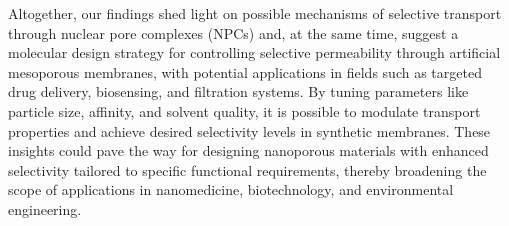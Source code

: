 \documentclass[12pt, a4paper]{article}
\begin{document}



Altogether, our findings shed light on possible mechanisms of selective transport through nuclear pore complexes (NPCs) and, at the same time, suggest a molecular design strategy for controlling selective permeability through artificial mesoporous membranes, with potential applications in fields such as targeted drug delivery, biosensing, and filtration systems.
By tuning parameters like particle size, affinity, and solvent quality, it is possible to modulate transport properties and achieve desired selectivity levels in synthetic membranes.
These insights could pave the way for designing nanoporous materials with enhanced selectivity tailored to specific functional requirements, thereby broadening the scope of applications in nanomedicine, biotechnology, and environmental engineering.


\printbibliography
\end{document}
